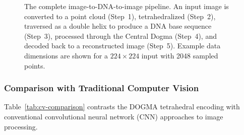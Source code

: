 \begin{figure}[ht]
\caption{The complete image-to-DNA-to-image pipeline. An input image is converted to a point cloud (Step~1), tetrahedralized (Step~2), traversed as a double helix to produce a DNA base sequence (Step~3), processed through the Central Dogma (Step~4), and decoded back to a reconstructed image (Step~5). Example data dimensions are shown for a $224 \times 224$ input with 2048 sampled points.}
\label{fig:image-dna-pipeline}
\end{figure}

\subsubsection{Comparison with Traditional Computer Vision}

Table~\ref{tab:cv-comparison} contrasts the DOGMA tetrahedral encoding with conventional convolutional neural network (CNN) approaches to image processing.

